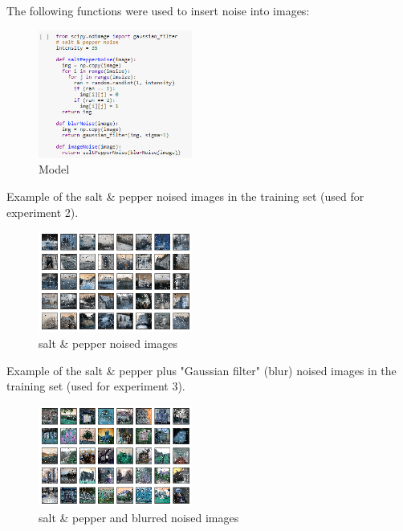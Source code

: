 \documentclass[twocolumn,showpacs,%
  nofootinbib,aps,superscriptaddress,%
  eqsecnum,prd,notitlepage,showkeys,10pt]{revtex4-1}
\begin{document}
The following functions were used to insert noise into images:
\begin{figure}[H]
\includegraphics[width=0.45\textwidth]{images/noise.PNG}
\caption{\label{fig:noise}Model}
\end{figure}
Example of the salt \& pepper noised images in the training set (used for experiment 2).
\begin{figure}[H]
    \includegraphics[width=0.45\textwidth]{images/64_full_noise.png}
    \caption{\label{fig:noise} salt \& pepper noised images}
\end{figure}
Example of the salt \& pepper plus "Gaussian filter" (blur) noised images in the training set (used for experiment 3).
\begin{figure}[H]
    \includegraphics[width=0.45\textwidth]{images/64x64.png}
    \caption{\label{fig:noise} salt \& pepper and blurred noised images}
\end{figure}
\end{document}
